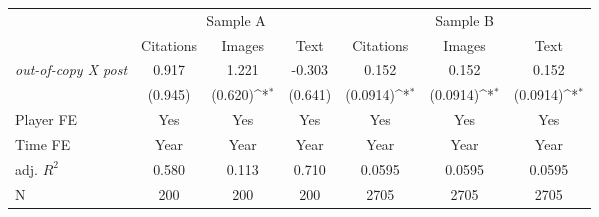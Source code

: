 {
\def\sym#1{\ifmmode^{#1}\else\(^{#1}\)\fi}
\begin{tabular*}{\hsize}{@{\hskip\tabcolsep\extracolsep\fill}l*{6}{c}}
\toprule
            &\multicolumn{3}{c}{Sample A}                                     &\multicolumn{3}{c}{Sample B}                                     \\\cmidrule(lr){2-4}\cmidrule(lr){5-7}
            &\multicolumn{1}{c}{Citations}&\multicolumn{1}{c}{Images}&\multicolumn{1}{c}{Text}&\multicolumn{1}{c}{Citations}&\multicolumn{1}{c}{Images}&\multicolumn{1}{c}{Text}\\
\midrule
\emph{out-of-copy X post}&       0.917         &       1.221         &      -0.303         &       0.152         &       0.152         &       0.152         \\
            &     (0.945)         &     (0.620)\sym{*}  &     (0.641)         &    (0.0914)\sym{*}  &    (0.0914)\sym{*}  &    (0.0914)\sym{*}  \\
\midrule
Player FE   &         Yes         &         Yes         &         Yes         &         Yes         &         Yes         &         Yes         \\
Time FE     &        Year         &        Year         &        Year         &        Year         &        Year         &        Year         \\
adj. $R^2$  &       0.580         &       0.113         &       0.710         &      0.0595         &      0.0595         &      0.0595         \\
N           &         200         &         200         &         200         &        2705         &        2705         &        2705         \\
\bottomrule
\end{tabular*}
}
